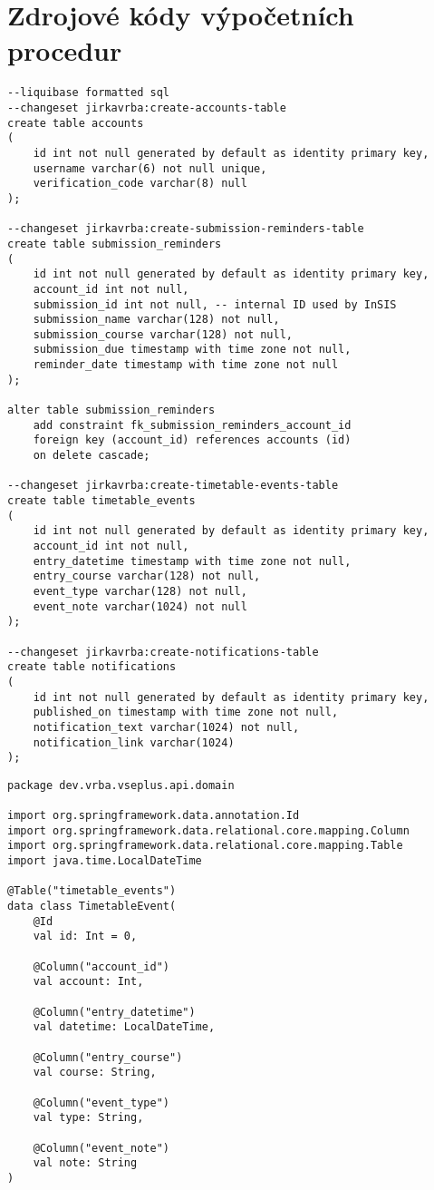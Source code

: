 \chapter{Zdrojové kódy výpočetních procedur}

\begin{lstlisting}[label={code:liquibase-changelog}, caption={SQL soubor s~migracemi pro nástroj Liquibase (vlastní zpracování)}]
--liquibase formatted sql
--changeset jirkavrba:create-accounts-table
create table accounts
(
    id int not null generated by default as identity primary key,
    username varchar(6) not null unique,
    verification_code varchar(8) null
);

--changeset jirkavrba:create-submission-reminders-table
create table submission_reminders
(
    id int not null generated by default as identity primary key,
    account_id int not null,
    submission_id int not null, -- internal ID used by InSIS
    submission_name varchar(128) not null,
    submission_course varchar(128) not null,
    submission_due timestamp with time zone not null,
    reminder_date timestamp with time zone not null
);

alter table submission_reminders
    add constraint fk_submission_reminders_account_id 
    foreign key (account_id) references accounts (id) 
    on delete cascade;

--changeset jirkavrba:create-timetable-events-table
create table timetable_events
(
    id int not null generated by default as identity primary key,
    account_id int not null,
    entry_datetime timestamp with time zone not null,
    entry_course varchar(128) not null,
    event_type varchar(128) not null,
    event_note varchar(1024) not null
);

--changeset jirkavrba:create-notifications-table
create table notifications
(
    id int not null generated by default as identity primary key,
    published_on timestamp with time zone not null,
    notification_text varchar(1024) not null,
    notification_link varchar(1024)
);
\end{lstlisting}

\begin{lstlisting}[label={code:timetable-event-domain-class}, caption={Zdrojový kód doménové třídy \code{TimetableEvent}}]
package dev.vrba.vseplus.api.domain

import org.springframework.data.annotation.Id
import org.springframework.data.relational.core.mapping.Column
import org.springframework.data.relational.core.mapping.Table
import java.time.LocalDateTime

@Table("timetable_events")
data class TimetableEvent(
    @Id
    val id: Int = 0,

    @Column("account_id")
    val account: Int,

    @Column("entry_datetime")
    val datetime: LocalDateTime,

    @Column("entry_course")
    val course: String,

    @Column("event_type")
    val type: String,

    @Column("event_note")
    val note: String
)
\end{lstlisting}

